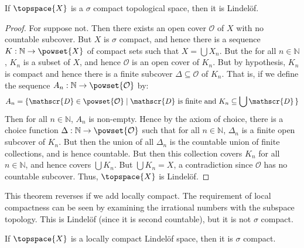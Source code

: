 \documentclass{article}                                                        %
\begin{document}
        \begin{theorem}
            If $\topspace{X}$ is a $\sigma$ compact topological space, then it
            is Lindel\"{o}f.
        \end{theorem}
        \begin{proof}
            For suppose not. Then there exists an open cover $\mathcal{O}$ of
            $X$ with no countable subcover. But $X$ is $\sigma$ compact, and
            hence there is a sequence $K:\mathbb{N}\rightarrow\powset{X}$ of
            compact sets such that $X=\bigcup{X}_{n}$. But the for all
            $n\in\mathbb{N}$, $K_{n}$ is a subset of $X$, and hence
            $\mathcal{O}$ is an open cover of $K_{n}$. But by hypothesis,
            $K_{n}$ is compact and hence there is a finite subcover
            $\Delta\subseteq\mathcal{O}$ of $K_{n}$. That is, if we define the
            sequence $A_{n}:\mathbb{N}\rightarrow\powset{\mathcal{O}}$ by:
            \begin{equation}
                A_{n}=\{\mathscr{D}\in\powset{\mathcal{O}}\;|\;
                    \mathscr{D}\textrm{ is finite and }
                    K_{n}\subseteq\bigcup\mathscr{D}\,\}
            \end{equation}
            Then for all $n\in\mathbb{N}$, $A_{n}$ is non-empty. Hence by the
            axiom of choice, there is a choice function
            $\Delta:\mathbb{N}\rightarrow\powset{\mathcal{O}}$ such that for all
            $n\in\mathbb{N}$, $\Delta_{n}$ is a finite open subcover of $K_{n}$.
            But then the union of all $\Delta_{n}$ is the countable union of
            finite collections, and is hence countable. But then this collection
            covers $K_{n}$ for all $n\in\mathbb{N}$, and hence covers
            $\bigcup{K}_{n}$. But $\bigcup{K}_{n}=X$, a contradiction since
            $\mathcal{O}$ has no countable subcover. Thus, $\topspace{X}$ is
            Lindel\"{o}f.
        \end{proof}
        This theorem reverses if we add locally compact. The requirement of
        local compactness can be seen by examining the irrational numbers with
        the subspace topology. This is Lindel\"{o}f (since it is second
        countable), but it is not $\sigma$ compact.
        \begin{theorem}
            If $\topspace{X}$ is a locally compact Lindel\"{o}f space, then it
            is $\sigma$ compact.
        \end{theorem}
\end{document}
